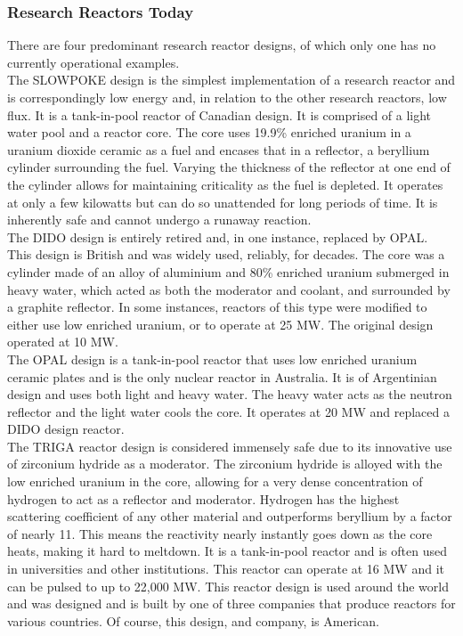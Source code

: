 \subsubsection{Research Reactors Today}
There are four predominant research reactor designs, of which only one has no currently operational examples.\\
The SLOWPOKE design is the simplest implementation of a research reactor and is correspondingly low energy and, in relation to the other research reactors, low flux. It is a tank-in-pool reactor of Canadian design. It is comprised of a light water pool and a reactor core. The core uses 19.9\% enriched uranium in a uranium dioxide ceramic as a fuel and encases that in a reflector, a beryllium cylinder surrounding the fuel. Varying the thickness of the reflector at one end of the cylinder allows for maintaining criticality as the fuel is depleted. It operates at only a few kilowatts but can do so unattended for long periods of time. It is inherently safe and cannot undergo a runaway reaction.\\
The DIDO design is entirely retired and, in one instance, replaced by OPAL. This design is British and was widely used, reliably, for decades. The core was a cylinder made of an alloy of aluminium and 80\% enriched uranium submerged in heavy water, which acted as both the moderator and coolant, and surrounded by a graphite reflector. In some instances, reactors of this type were modified to either use low enriched uranium, or to operate at 25 MW. The original design operated at 10 MW.\\
The OPAL design is a tank-in-pool reactor that uses low enriched uranium ceramic plates and is the only nuclear reactor in Australia. It is of Argentinian design and uses both light and heavy water. The heavy water acts as the neutron reflector and the light water cools the core. It operates at 20 MW and replaced a DIDO design reactor.\\
The TRIGA reactor design is considered immensely safe due to its innovative use of zirconium hydride as a moderator. The zirconium hydride is alloyed with the low enriched uranium in the core, allowing for a very dense concentration of hydrogen to act as a reflector and moderator. Hydrogen has the highest scattering coefficient of any other material and outperforms beryllium by a factor of nearly 11. This means the reactivity nearly instantly goes down as the core heats, making it hard to meltdown. It is a tank-in-pool reactor and is often used in universities and other institutions. This reactor can operate at 16 MW and it can be pulsed to up to 22,000 MW. This reactor design is used around the world and was designed and is built by one of three companies that produce reactors for various countries. Of course, this design, and company, is American.\\

